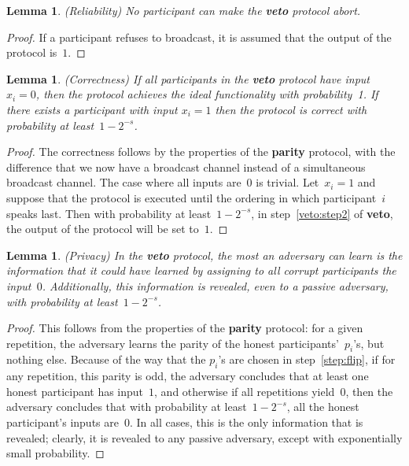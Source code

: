 \documentclass[11pt]{article}
\newtheorem{lemma}[theorem]{Lemma}
\begin{document}
\begin{lemma} \label{lemma:veto3}(Reliability)
No participant can make the \textbf{veto} protocol abort.
\end{lemma}

\begin{proof}
If a participant refuses to broadcast, it is assumed that the output
of the protocol is~$1$.
\end{proof}

\begin{lemma} \label{lemma:veto1}(Correctness)
If all participants in the \textbf{veto} protocol have input
$x_i=0$, then the protocol achieves the ideal functionality with
probability~1. If there exists a participant with input $x_i=1$ then
the protocol is correct with probability at least~$1-2^{-s}$.
\end{lemma}

\begin{proof}
The correctness follows by the properties of the \textbf{parity}
protocol, with the difference that we now have a broadcast channel
instead of a simultaneous broadcast channel. The case where all
inputs are~0 is trivial. Let~$x_i=1$ and suppose that the protocol
is executed until the ordering in which participant~$i$ speaks last.
Then with probability at least~$1-2^{-s}$, in step~\ref{veto:step2}
of \textbf{veto}, the output of the  protocol will be set to~$1$.
\end{proof}

\begin{lemma}\label{veto_HC}
\label{lem:veto4} (Privacy) In the \textbf{veto} protocol, the most
 an adversary can learn is the information
that it could have learned by assigning to all corrupt participants
the input~$0$. Additionally, this information is revealed, even to a
passive adversary,
 with
probability at least~$1-2^{-s}$.
\end{lemma}

\begin{proof}
This follows from the properties of the \textbf{parity} protocol:
for a given repetition, the adversary learns the parity of the
honest participants'~$p_i$'s, but nothing else.
 Because of the way that the $p_i$'s are chosen in
step~\ref{step:flip}, if for any repetition, this parity is odd, the
adversary concludes that at least one honest participant has
input~$1$,  and otherwise if all repetitions yield~$0$, then the
adversary concludes that with probability at least~$1-2^{-s}$, all
the honest participant's inputs are~$0$.  In all cases, this is the
only information that is revealed; clearly, it is revealed to any passive adversary, except with exponentially small probability.
\end{proof}
\end{document}
